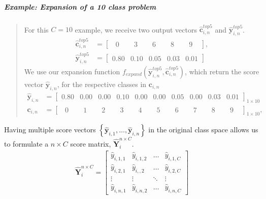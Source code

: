 \subparagraph{Example: Expansion of a 10 class problem} 
\blockquote[]{	 	
	For this $C=10$ example, we receive two output vectors $\bm{\hat{c}}_{i,n}^{top5}$ and $ \bm{\hat{y}}_{i,n}^{top5}$.
	\begin{align*}
	\bm{\hat{c}}_{i,n}^{top5} &= \begin{bmatrix}
	\phantom{0}0\phantom{.0} & \phantom{0}3\phantom{.0} & \phantom{0}6\phantom{.0} & \phantom{0}8\phantom{.0} & \phantom{0}9\phantom{.0}
	\end{bmatrix},\\
	\bm{\hat{y}}_{i,n}^{top5} &= \begin{bmatrix}
	0.80 & 0.10 & 0.05 & 0.03 & 0.01
	\end{bmatrix}
	\end{align*}
	We use our expansion function $ f_{expand}\left(\bm{\hat{y}}_{i,n}^{top5},\bm{\hat{c}}_{i,n}^{top5}\right) $, which return the score vector $ \mathbf{\hat{y}}_{i,n}$, for the respective classes in $ \bm{c}_{i,n} $
	\begin{align*}
	\mathbf{\hat{y}}_{i,n}  &= \begin{bmatrix}
	0.80 & 0.00 & 0.00 & 0.10 & 0.00 & 0.00 & 0.05 & 0.00 & 0.03 & 0.01
	\end{bmatrix}_{1 \times 10} \\
	\bm{c}_{i,n} &= \begin{bmatrix}
	\phantom{0}0\phantom{.0} & \phantom{0}1\phantom{.0} & \phantom{0}2\phantom{.0} & \phantom{0}3\phantom{.0} & \phantom{0}4\phantom{.0} & \phantom{0}5\phantom{.0} & \phantom{0}6\phantom{.0} & \phantom{0}7\phantom{.0} & \phantom{0}8\phantom{.0} & \phantom{0}9\phantom{.0}
	\end{bmatrix}_{1 \times 10},
	\end{align*}
}      

Having multiple score vectors $ \left\{\bm{\hat{y}}_{i,1}, \dots, \bm{\hat{y}}_{i,n}\right\}  $ in the original class space allows us to formulate a $ n \times C $ score matrix, $ \bm{\hat{Y}}_{i}^{n \times C} $.
\begin{align}
\bm{\hat{Y}}_{i}^{n \times C} =
\begin{bmatrix}
\hat{y}_{i,1,1} & \hat{y}_{i,1,2} & \dots & \hat{y}_{i,1,C} \\
\hat{y}_{i,2,1} & \hat{y}_{i,,2} & \dots & \hat{y}_{i,2,C} \\
\vdots & \vdots & \ddots & \vdots \\
\hat{y}_{i,n,1} & \hat{y}_{i,n,2} & \dots & \hat{y}_{i,n,C}
\end{bmatrix}
\end{align}

